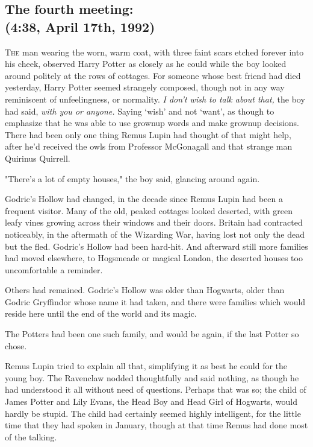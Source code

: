 
\subsection{The fourth meeting:\\
(4:38\PM, April 17th, 1992)}

\lettrine{T}{he} man wearing the worn, warm coat, with three faint scars etched forever into
his cheek, observed Harry Potter as closely as he could while the boy looked
around politely at the rows of cottages. For someone whose best friend had died
yesterday, Harry Potter seemed strangely composed, though not in any way
reminiscent of unfeelingness, or normality. \emph{I don't wish to talk about
that,} the boy had said, \emph{with you or anyone.} Saying `wish' and not
`want', as though to emphasize that he was able to use grownup words and make
grownup decisions. There had been only one thing Remus Lupin had thought of
that might help, after he'd received the owls from Professor McGonagall and
that strange man Quirinus Quirrell.

"There's a lot of empty houses," the boy said, glancing around again.

Godric's Hollow had changed, in the decade since Remus Lupin had been a
frequent visitor. Many of the old, peaked cottages looked deserted, with green
leafy vines growing across their windows and their doors. Britain had
contracted noticeably, in the aftermath of the Wizarding War, having lost not
only the dead but the fled. Godric's Hollow had been hard-hit. And afterward
still more families had moved elsewhere, to Hogsmeade or magical London, the
deserted houses too uncomfortable a reminder.

Others had remained. Godric's Hollow was older than Hogwarts, older than Godric
Gryffindor whose name it had taken, and there were families which would reside
here until the end of the world and its magic.

The Potters had been one such family, and would be again, if the last Potter so
chose.

Remus Lupin tried to explain all that, simplifying it as best he could for the
young boy. The Ravenclaw nodded thoughtfully and said nothing, as though he had
understood it all without need of questions. Perhaps that was so; the child of
James Potter and Lily Evans, the Head Boy and Head Girl of Hogwarts, would
hardly be stupid. The child had certainly seemed highly intelligent, for the
little time that they had spoken in January, though at that time Remus had done
most of the talking.

